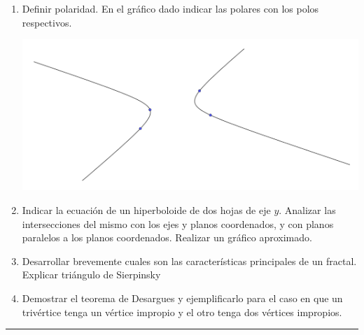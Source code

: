 \documentclass[9pt,a4paper]{extarticle}
\begin{document}
\begin{enumerate}

\item Definir polaridad. En el gráfico dado indicar las polares con los polos respectivos.

\begin{center}
\includegraphics[scale=0.6]{51217punto1}
\end{center}


\item Indicar la ecuación de un hiperboloide de dos hojas  de eje $y$. Analizar las intersecciones      del mismo con los ejes y planos coordenados, y con  planos paralelos a los planos coordenados. Realizar un gráfico  aproximado.


\item Desarrollar brevemente cuales son las características principales  de un fractal. Explicar triángulo de Sierpinsky 


\item Demostrar  el teorema de Desargues y ejemplificarlo para el caso en que un trivértice tenga un vértice impropio y el otro tenga dos vértices impropios.

\end{enumerate}
\hrule

\end{document}
